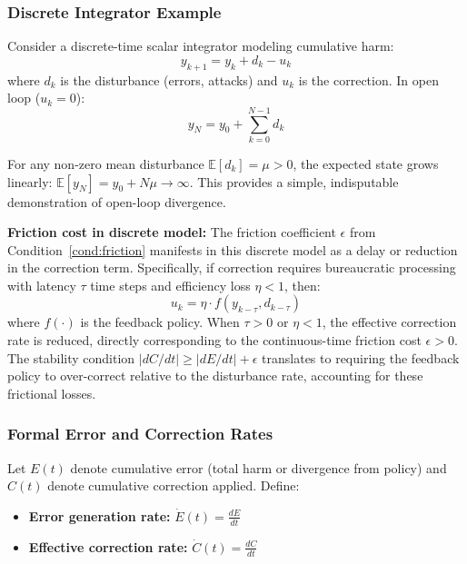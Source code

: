 \documentclass{article}
\begin{document}
\subsubsection{Discrete Integrator Example}

Consider a discrete-time scalar integrator modeling cumulative harm:
\begin{equation}
y_{k+1} = y_k + d_k - u_k
\end{equation}
where $d_k$ is the disturbance (errors, attacks) and $u_k$ is the correction. In open loop ($u_k = 0$):
\begin{equation}
y_N = y_0 + \sum_{k=0}^{N-1} d_k
\end{equation}

For any non-zero mean disturbance $\mathbb{E}[d_k] = \mu > 0$, the expected state grows linearly: $\mathbb{E}[y_N] = y_0 + N\mu \to \infty$. This provides a simple, indisputable demonstration of open-loop divergence.

\textbf{Friction cost in discrete model:} The friction coefficient $\epsilon$ from Condition~\ref{cond:friction} manifests in this discrete model as a delay or reduction in the correction term. Specifically, if correction requires bureaucratic processing with latency $\tau$ time steps and efficiency loss $\eta < 1$, then:
\begin{equation}
u_k = \eta \cdot f(y_{k-\tau}, d_{k-\tau})
\end{equation}
where $f(\cdot)$ is the feedback policy. When $\tau > 0$ or $\eta < 1$, the effective correction rate is reduced, directly corresponding to the continuous-time friction cost $\epsilon > 0$. The stability condition $|dC/dt| \geq |dE/dt| + \epsilon$ translates to requiring the feedback policy to over-correct relative to the disturbance rate, accounting for these frictional losses.

\subsubsection{Formal Error and Correction Rates}

Let $E(t)$ denote cumulative error (total harm or divergence from policy) and $C(t)$ denote cumulative correction applied. Define:
\begin{itemize}
    \item \textbf{Error generation rate:} $\dot{E}(t) = \frac{dE}{dt}$
    \item \textbf{Effective correction rate:} $\dot{C}(t) = \frac{dC}{dt}$
\end{itemize}
\end{document}

